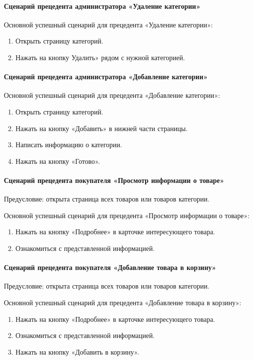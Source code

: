 \paragraph{Сценарий прецедента администратора «Удаление категории»}

Основной успешный сценарий для прецедента «Удаление категории»:
\begin{enumerate}
	\item Открыть страницу категорий.
	\item Нажать на кнопку Удалить» рядом с нужной категорией.
\end{enumerate}

\paragraph{Сценарий прецедента администратора «Добавление категории»}

Основной успешный сценарий для прецедента «Добавление категории»:
\begin{enumerate}
	\item Открыть страницу категорий.
	\item Нажать на кнопку «Добавить» в нижней части страницы.
	\item Написать информацию о категории.
	\item Нажать на кнопку «Готово».
\end{enumerate}


\paragraph{Сценарий прецедента покупателя «Просмотр информации о товаре»}
Предусловие: открыта страница всех товаров или товаров категории.

Основной успешный сценарий для прецедента «Просмотр информации о товаре»:
\begin{enumerate}
	\item Нажать на кнопку «Подробнее» в карточке интересующего товара.
	\item Ознакомиться с представленной информацией.
\end{enumerate}

\paragraph{Сценарий прецедента покупателя «Добавление товара в корзину»}
Предусловие: открыта страница всех товаров или товаров категории.

Основной успешный сценарий для прецедента «Добавление товара в корзину»:
\begin{enumerate}
	\item Нажать на кнопку «Подробнее» в карточке интересующего товара.
	\item Ознакомиться с представленной информацией.
	\item Нажать на кнопку «Добавить в корзину».
\end{enumerate}

